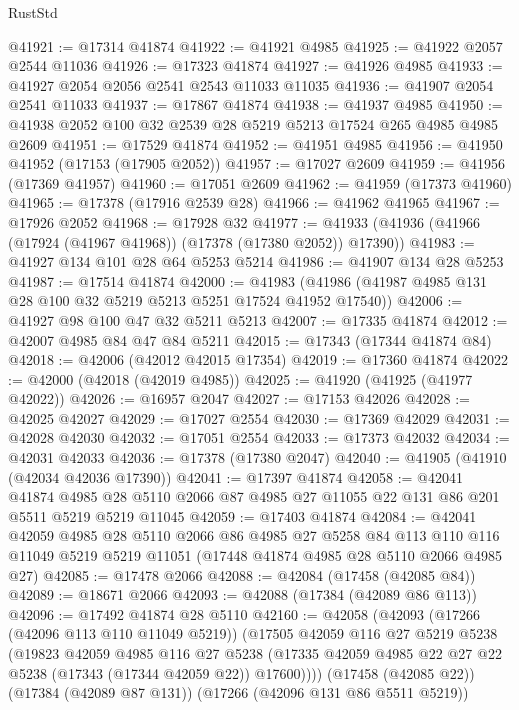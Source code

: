 \begin{lexlean}{RustStd}
\begin{coremodule}
@41921 := @17314 @41874
@41922 := @41921 @4985
@41925 := @41922 @2057 @2544 @11036
@41926 := @17323 @41874
@41927 := @41926 @4985
@41933 := @41927 @2054 @2056 @2541 @2543 @11033 @11035
@41936 := @41907 @2054 @2541 @11033
@41937 := @17867 @41874
@41938 := @41937 @4985
@41950 := @41938 @2052 @100 @32 @2539 @28 @5219 @5213 @17524 @265 @4985 @4985 @2609
@41951 := @17529 @41874
@41952 := @41951 @4985
@41956 := @41950 @41952 (@17153 (@17905 @2052))
@41957 := @17027 @2609
@41959 := @41956 (@17369 @41957)
@41960 := @17051 @2609
@41962 := @41959 (@17373 @41960)
@41965 := @17378 (@17916 @2539 @28)
@41966 := @41962 @41965
@41967 := @17926 @2052
@41968 := @17928 @32
@41977 := @41933 (@41936 (@41966 (@17924 (@41967 @41968)) (@17378 (@17380 @2052)) @17390))
@41983 := @41927 @134 @101 @28 @64 @5253 @5214
@41986 := @41907 @134 @28 @5253
@41987 := @17514 @41874
@42000 := @41983 (@41986 (@41987 @4985 @131 @28 @100 @32 @5219 @5213 @5251 @17524 @41952 @17540))
@42006 := @41927 @98 @100 @47 @32 @5211 @5213
@42007 := @17335 @41874
@42012 := @42007 @4985 @84 @47 @84 @5211
@42015 := @17343 (@17344 @41874 @84)
@42018 := @42006 (@42012 @42015 @17354)
@42019 := @17360 @41874
@42022 := @42000 (@42018 (@42019 @4985))
@42025 := @41920 (@41925 (@41977 @42022))
@42026 := @16957 @2047
@42027 := @17153 @42026
@42028 := @42025 @42027
@42029 := @17027 @2554
@42030 := @17369 @42029
@42031 := @42028 @42030
@42032 := @17051 @2554
@42033 := @17373 @42032
@42034 := @42031 @42033
@42036 := @17378 (@17380 @2047)
@42040 := @41905 (@41910 (@42034 @42036 @17390))
@42041 := @17397 @41874
@42058 := @42041
    @41874
    @4985
    @28
    @5110
    @2066
    @87
    @4985
    @27
    @11055
    @22
    @131
    @86
    @201
    @5511
    @5219
    @5219
    @11045
@42059 := @17403 @41874
@42084 := @42041
    @42059
    @4985
    @28
    @5110
    @2066
    @86
    @4985
    @27
    @5258
    @84
    @113
    @110
    @116
    @11049
    @5219
    @5219
    @11051
    (@17448 @41874 @4985 @28 @5110 @2066 @4985 @27)
@42085 := @17478 @2066
@42088 := @42084 (@17458 (@42085 @84))
@42089 := @18671 @2066
@42093 := @42088 (@17384 (@42089 @86 @113))
@42096 := @17492 @41874 @28 @5110
@42160 := @42058
    (@42093
      (@17266 (@42096 @113 @110 @11049 @5219))
      (@17505
        @42059
        @116
        @27
        @5219
        @5238
        (@19823
          @42059
          @4985
          @116
          @27
          @5238
          (@17335 @42059 @4985 @22 @27 @22 @5238 (@17343 (@17344 @42059 @22)) @17600))))
    (@17458 (@42085 @22))
    (@17384 (@42089 @87 @131))
    (@17266 (@42096 @131 @86 @5511 @5219))

\end{coremodule}
\end{lexlean}
